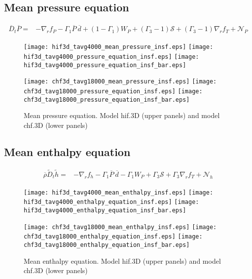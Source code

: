 \documentclass[10pt,paper=a4]{report}
\newcommand{\eht}{\overline}
\newcommand{\fav}{\widetilde}
\newcommand{\av}{\overline}
\def\erho{\eht{\rho}}
\begin{document}
\newpage

\subsection{Mean pressure equation }

\begin{align}
\av{D}_t \av{P} = & -\nabla_r f_P - \Gamma_1 \eht{P} \ \eht{d} + (1 -\Gamma_1) W_P + (\Gamma_3 -1){\mathcal S} + (\Gamma_3 - 1)\nabla_r f_T + {\mathcal N_P} 
\end{align}

\begin{figure}[!h]
\centerline{
\texttt{[image: hif3d\_tavg4000\_mean\_pressure\_insf.eps]}
\texttt{[image: hif3d\_tavg4000\_pressure\_equation\_insf.eps]}
\texttt{[image: hif3d\_tavg4000\_pressure\_equation\_insf\_bar.eps]}}

\centerline{
\texttt{[image: chf3d\_tavg18000\_mean\_pressure\_insf.eps]}
\texttt{[image: chf3d\_tavg18000\_pressure\_equation\_insf.eps]}
\texttt{[image: chf3d\_tavg18000\_pressure\_equation\_insf\_bar.eps]}}
\caption{Mean pressure equation. Model {\sf hif.3D} (upper panels) and model {\sf chf.3D} (lower panels)}
\end{figure}

\newpage

\subsection{Mean enthalpy equation}

\begin{align}
\erho\fav{D}_t \fav{h} = & -\nabla_r f_h - \Gamma_1\eht{P} \ \eht{d} - \Gamma_1 W_P + \Gamma_3 {\mathcal S} + \Gamma_3 \nabla_r f_T +  {\mathcal N_h} \label{eq:rans_h}
\end{align}

\begin{figure}[!h]
\centerline{
\texttt{[image: hif3d\_tavg4000\_mean\_enthalpy\_insf.eps]}
\texttt{[image: hif3d\_tavg4000\_enthalpy\_equation\_insf.eps]}
\texttt{[image: hif3d\_tavg4000\_enthalpy\_equation\_insf\_bar.eps]}}

\centerline{
\texttt{[image: chf3d\_tavg18000\_mean\_enthalpy\_insf.eps]}
\texttt{[image: chf3d\_tavg18000\_enthalpy\_equation\_insf.eps]}
\texttt{[image: chf3d\_tavg18000\_enthalpy\_equation\_insf\_bar.eps]}}

\caption{Mean enthalpy equation. Model {\sf hif.3D} (upper panels) and model {\sf chf.3D} (lower panels)}
\end{figure}
\end{document}
